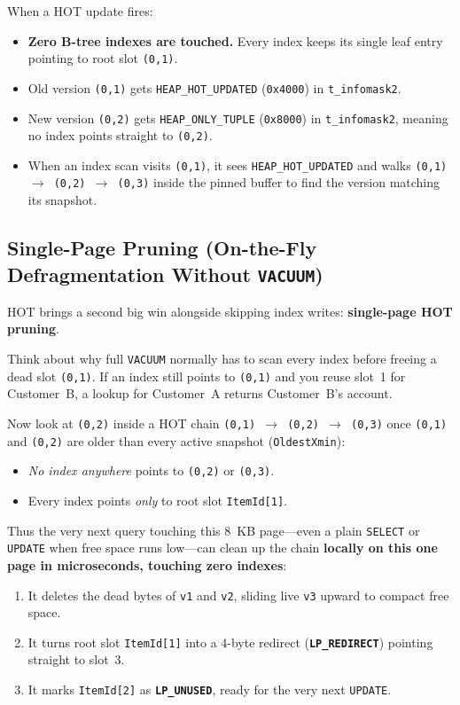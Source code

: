When a HOT update fires:
\begin{itemize}
  \item \textbf{Zero B-tree indexes are touched.} Every index keeps its single leaf entry pointing to root slot \texttt{(0,1)}.
  \item Old version \texttt{(0,1)} gets \texttt{HEAP\_HOT\_UPDATED} (\texttt{0x4000}) in \texttt{t\_infomask2}.
  \item New version \texttt{(0,2)} gets \texttt{HEAP\_ONLY\_TUPLE} (\texttt{0x8000}) in \texttt{t\_infomask2}, meaning no index points straight to \texttt{(0,2)}.
  \item When an index scan visits \texttt{(0,1)}, it sees \texttt{HEAP\_HOT\_UPDATED} and walks \texttt{(0,1) $\to$ (0,2) $\to$ (0,3)} inside the pinned buffer to find the version matching its snapshot.
\end{itemize}

\subsection{Single-Page Pruning (On-the-Fly Defragmentation Without \texttt{VACUUM})}

HOT brings a second big win alongside skipping index writes: \textbf{single-page HOT pruning}.

Think about why full \texttt{VACUUM} normally has to scan every index before freeing a dead slot \texttt{(0,1)}. If an index still points to \texttt{(0,1)} and you reuse slot~1 for Customer~B, a lookup for Customer~A returns Customer~B's account.

Now look at \texttt{(0,2)} inside a HOT chain \texttt{(0,1) $\to$ (0,2) $\to$ (0,3)} once \texttt{(0,1)} and \texttt{(0,2)} are older than every active snapshot (\texttt{OldestXmin}):
\begin{itemize}
  \item \emph{No index anywhere} points to \texttt{(0,2)} or \texttt{(0,3)}.
  \item Every index points \emph{only} to root slot \texttt{ItemId[1]}.
\end{itemize}
Thus the very next query touching this 8~KB page---even a plain \texttt{SELECT} or \texttt{UPDATE} when free space runs low---can clean up the chain \textbf{locally on this one page in microseconds, touching zero indexes}:
\begin{enumerate}
  \item It deletes the dead bytes of \texttt{v1} and \texttt{v2}, sliding live \texttt{v3} upward to compact free space.
  \item It turns root slot \texttt{ItemId[1]} into a 4-byte redirect (\textbf{\texttt{LP\_REDIRECT}}) pointing straight to slot~3.
  \item It marks \texttt{ItemId[2]} as \textbf{\texttt{LP\_UNUSED}}, ready for the very next \texttt{UPDATE}.
\end{enumerate}

